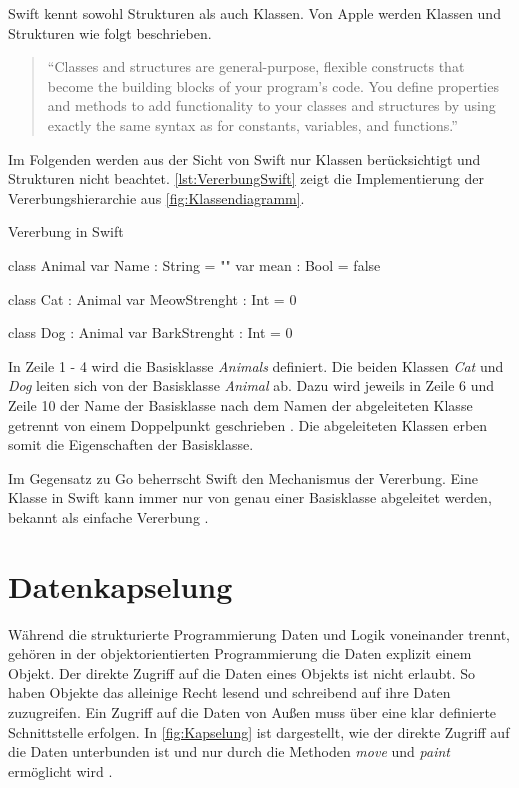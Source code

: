 Swift kennt sowohl Strukturen als auch Klassen. Von Apple werden Klassen und Strukturen wie folgt beschrieben. 
\begin{quote}
\enquote{Classes and structures are general-purpose, flexible constructs that become the building blocks of your program’s code. You define properties and methods to add functionality to your classes and
structures by using exactly the same syntax as for constants, variables, and functions.} \cite[S.183]{Apple.2017}
\end{quote}

Im Folgenden werden aus der Sicht von Swift nur Klassen berücksichtigt und Strukturen nicht beachtet.
\autoref{lst:VererbungSwift} zeigt die Implementierung der Vererbungshierarchie aus \autoref{fig:Klassendiagramm}.

\begin{listing}[H]
\caption{Vererbung in Swift}
\label{lst:VererbungSwift}
\begin{SwiftCode}
class Animal{
    var Name : String = ""
    var mean : Bool = false
}

class Cat : Animal{
    var MeowStrenght : Int = 0
}

class Dog : Animal{
    var BarkStrenght : Int = 0
}
\end{SwiftCode}
\end{listing}

In Zeile 1 - 4 wird die Basisklasse \emph{Animals} definiert. 
Die beiden Klassen \textit{Cat} und \textit{Dog} leiten sich von der Basisklasse \textit{Animal} ab. 
Dazu wird jeweils in Zeile 6 und Zeile 10 der Name der Basisklasse nach dem Namen der abgeleiteten Klasse getrennt von einem Doppelpunkt geschrieben \cite[S.226]{Apple.2017}.
Die abgeleiteten Klassen erben somit die Eigenschaften der Basisklasse. 

Im Gegensatz zu Go beherrscht Swift den Mechanismus der Vererbung.
Eine Klasse in Swift kann immer nur von genau einer Basisklasse abgeleitet werden, bekannt als einfache Vererbung \cite[S.125]{Hoffman.2017}.

\section{Datenkapselung}
Während die strukturierte Programmierung Daten und Logik voneinander trennt, gehören in der objektorientierten Programmierung die Daten explizit einem Objekt. 
Der direkte Zugriff auf die Daten eines Objekts ist nicht erlaubt. 
So haben Objekte das alleinige Recht lesend und schreibend auf ihre Daten zuzugreifen. 
Ein Zugriff auf die Daten von Außen muss über eine klar definierte Schnittstelle erfolgen.
In \autoref{fig:Kapselung} ist dargestellt, wie der direkte Zugriff auf die Daten unterbunden ist und nur durch die Methoden \emph{move} und \emph{paint} ermöglicht wird \cite[]{Lahres.2011}.

